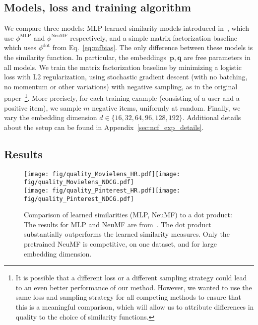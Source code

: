 \documentclass{article}
\newcommand{\embu}{\mathbf{p}}
\newcommand{\embi}{\mathbf{q}}
\begin{document}
\subsection{Models, loss and training algorithm}
We compare three models: MLP-learned similarity models introduced in~\cite{he:www17}, which use $\phi^{\text{MLP}}$ and $\phi^{\text{NeuMF}}$ respectively, and a simple matrix factorization baseline which uses $\phi^{\text{dot}}$ from Eq.~\eqref{eq:mfbias}. The only difference between these models is the similarity function. In particular, the embeddings~$\embu, \embi$ are free parameters in all models.
We train the matrix factorization baseline by minimizing a logistic loss with L2 regularization, using stochastic gradient descent (with no batching, no momentum or other variations) with negative sampling, as in the original paper~\cite{he:www17}\footnote{It is possible that a different loss or a different sampling strategy could lead to an even better performance of our method. However, we wanted to use the same loss and sampling strategy for all competing methods to ensure that this is a meaningful comparison, which will allow us to attribute differences in quality to the choice of similarity functions.}.
More precisely, for each training example (consisting of a user and a positive item), we sample $m$ negative items, uniformly at random.
Finally, we vary the embedding dimension $d \in \{16,32,64,96, 128, 192\}$.
Additional details about the setup can be found in Appendix~\ref{sec:ncf_exp_details}.

\subsection{Results}
\label{sec:ncf_exp}

\begin{figure}
    \centering
    \texttt{[image: fig/quality\_Movielens\_HR.pdf]}\texttt{[image: fig/quality\_Movielens\_NDCG.pdf]}\\\texttt{[image: fig/quality\_Pinterest\_HR.pdf]}\texttt{[image: fig/quality\_Pinterest\_NDCG.pdf]}\caption{Comparison of learned similarities (MLP, NeuMF) to a dot product: The results for MLP and NeuMF are from~\cite{he:www17}. The dot product substantially outperforms the learned similarity measures. Only the pretrained NeuMF is competitive, on one dataset, and for large embedding dimension.}
    \label{fig:quality}
\end{figure}
\end{document}
